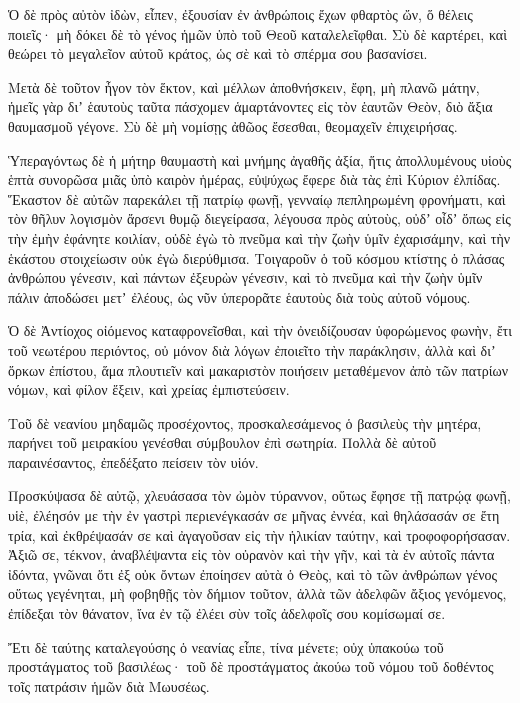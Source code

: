 {Ὁ δὲ πρὸς αὐτὸν ἰδὼν, εἶπεν, ἐξουσίαν ἐν ἀνθρώποις ἔχων φθαρτὸς ὤν, ὅ θέλεις ποιεῖς· μὴ δόκει δὲ τὸ γένος ἡμῶν ὑπὸ τοῦ Θεοῦ καταλελεῖφθαι.
Σὺ δὲ καρτέρει, καὶ θεώρει τὸ μεγαλεῖον αὐτοῦ κράτος, ὡς σὲ καὶ τὸ σπέρμα σου βασανίσει.
\par }{\PP {}Μετὰ δὲ τοῦτον ἦγον τὸν ἕκτον, καὶ μέλλων ἀποθνήσκειν, ἔφη, μὴ πλανῶ μάτην, ἡμεῖς γὰρ διʼ ἑαυτοὺς ταῦτα πάσχομεν ἁμαρτάνοντες εἰς τὸν ἑαυτῶν Θεὸν, διὸ ἄξια θαυμασμοῦ γέγονε.
Σὺ δὲ μὴ νομίσῃς ἀθῶος ἔσεσθαι, θεομαχεῖν ἐπιχειρήσας.
\par }{\PP {}Ὑπεραγόντως δὲ ἡ μήτηρ θαυμαστὴ καὶ μνήμης ἀγαθῆς ἀξία, ἥτις ἀπολλυμένους υἱοὺς ἑπτὰ συνορῶσα μιᾶς ὑπὸ καιρὸν ἡμέρας, εὐψύχως ἔφερε διὰ τὰς ἐπὶ Κύριον ἐλπίδας.
Ἕκαστον δὲ αὐτῶν παρεκάλει τῇ πατρίῳ φωνῇ, γενναίῳ πεπληρωμένη φρονήματι, καὶ τὸν θῆλυν λογισμὸν ἄρσενι θυμῷ διεγείρασα, λέγουσα πρὸς αὐτοὺς,
οὐδʼ οἶδʼ ὅπως εἰς τὴν ἐμὴν ἐφάνητε κοιλίαν, οὐδὲ ἐγὼ τὸ πνεῦμα καὶ τὴν ζωὴν ὑμῖν ἐχαρισάμην, καὶ τὴν ἑκάστου στοιχείωσιν οὐκ ἐγὼ διερύθμισα.
Τοιγαροῦν ὁ τοῦ κόσμου κτίστης ὁ πλάσας ἀνθρώπου γένεσιν, καὶ πάντων ἐξευρὼν γένεσιν, καὶ τὸ πνεῦμα καὶ τὴν ζωὴν ὑμῖν πάλιν ἀποδώσει μετʼ ἐλέους, ὡς νῦν ὑπερορᾶτε ἑαυτοὺς διὰ τοὺς αὐτοῦ νόμους.
\par }{\PP {}Ὁ δὲ Ἀντίοχος οἰόμενος καταφρονεῖσθαι, καὶ τὴν ὀνειδίζουσαν ὑφορώμενος φωνὴν, ἔτι τοῦ νεωτέρου περιόντος, οὐ μόνον διὰ λόγων ἐποιεῖτο τὴν παράκλησιν, ἀλλὰ καὶ διʼ ὅρκων ἐπίστου, ἅμα πλουτιεῖν καὶ μακαριστὸν ποιήσειν μεταθέμενον ἀπὸ τῶν πατρίων νόμων, καὶ φίλον ἕξειν, καὶ χρείας ἐμπιστεύσειν.
\par }{\PP {}Τοῦ δὲ νεανίου μηδαμῶς προσέχοντος, προσκαλεσάμενος ὁ βασιλεὺς τὴν μητέρα, παρήνει τοῦ μειρακίου γενέσθαι σύμβουλον ἐπὶ σωτηρία.
Πολλὰ δὲ αὐτοῦ παραινέσαντος, ἐπεδέξατο πείσειν τὸν υἱόν.
\par }{\PP {}Προσκύψασα δὲ αὐτῷ, χλευάσασα τὸν ὠμὸν τύραννον, οὕτως ἔφησε τῇ πατρῴᾳ φωνῇ, υἱὲ, ἐλέησόν με τὴν ἐν γαστρὶ περιενέγκασάν σε μῆνας ἐννέα, καὶ θηλάσασάν σε ἔτη τρία, καὶ ἐκθρέψασάν σε καὶ ἀγαγοῦσαν εἰς τὴν ἡλικίαν ταύτην, καὶ τροφοφορήσασαν.
Ἀξιῶ σε, τέκνον, ἀναβλέψαντα εἰς τὸν οὐρανὸν καὶ τὴν γῆν, καὶ τὰ ἐν αὐτοῖς πάντα ἰδόντα, γνῶναι ὅτι ἐξ οὐκ ὄντων ἐποίησεν αὐτὰ ὁ Θεὸς, καὶ τὸ τῶν ἀνθρώπων γένος οὕτως γεγένηται,
μὴ φοβηθῇς τὸν δήμιον τοῦτον, ἀλλὰ τῶν ἀδελφῶν ἄξιος γενόμενος, ἐπίδεξαι τὸν θάνατον, ἵνα ἐν τῷ ἐλέει σὺν τοῖς ἀδελφοῖς σου κομίσωμαί σε.
\par }{\PP {}Ἔτι δὲ ταύτης καταλεγούσης ὁ νεανίας εἶπε, τίνα μένετε; οὐχ ὑπακούω τοῦ προστάγματος τοῦ βασιλέως· τοῦ δὲ προστάγματος ἀκούω τοῦ νόμου τοῦ δοθέντος τοῖς πατράσιν ἡμῶν διὰ Μωυσέως.
}
